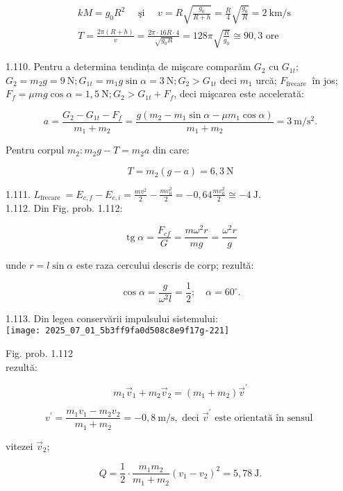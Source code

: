 $$
\begin{aligned}
& k M=g_{0} R^{2} \quad \text { şi } \quad v=R \sqrt{\frac{g_{0}}{R+h}}=\frac{R}{4} \sqrt{\frac{g_{0}}{R}}=2 \mathrm{~km} / \mathrm{s} \\
& T=\frac{2 \pi(R+h)}{v}=\frac{2 \pi \cdot 16 R \cdot 4}{\sqrt{g_{0} R}}=128 \pi \sqrt{\frac{R}{g_{0}}} \cong 90,3 \text { ore }
\end{aligned}
$$

1.110. Pentru a determina tendința de mişcare comparăm $G_{2}$ cu $G_{1 t}$; $G_{2}=m_{2} g=9 \mathrm{~N} ; G_{1 t}=m_{1} g \sin \alpha=3 \mathrm{~N} ; G_{2}>G_{1 t}$ deci $m_{1}$ urcă; $F_{\text {frecare }}$ în jos; $F_{f}=\mu m g \cos \alpha=1,5 \mathrm{~N} ; G_{2}>G_{1 t}+F_{f}$, deci mişcarea este accelerată:

$$
a=\frac{G_{2}-G_{1 t}-F_{f}}{m_{1}+m_{2}}=\frac{g\left(m_{2}-m_{1} \sin \alpha-\mu m_{1} \cos \alpha\right)}{m_{1}+m_{2}}=3 \mathrm{~m} / \mathrm{s}^{2} .
$$

Pentru corpul $m_{2}: m_{2} g-T=m_{2} a$ din care:

$$
T=m_{2}(g-a)=6,3 \mathrm{~N}
$$

1.111. $L_{\text {frecare }}=E_{c, f}-E_{c, i}=\frac{m v^{2}}{2}-\frac{m v_{0}^{2}}{2}=-0,64 \frac{m v_{0}^{2}}{2} \cong-4 \mathrm{~J}$.\\
1.112. Din Fig. prob. 1.112:

$$
\operatorname{tg} \alpha=\frac{F_{c f}}{G}=\frac{m \omega^{2} r}{m g}=\frac{\omega^{2} r}{g}
$$

unde $r=l \sin \alpha$ este raza cercului descris de corp; rezultă:

$$
\cos \alpha=\frac{g}{\omega^{2} l}=\frac{1}{2} ; \quad \alpha=60^{\circ} .
$$

1.113. Din legea conservării impulsului sistemului:\\
\texttt{[image: 2025\_07\_01\_5b3ff9fa0d508c8e9f17g-221]}

Fig. prob. 1.112\\
rezultă:

$$
m_{1} \vec{v}_{1}+m_{2} \vec{v}_{2}=\left(m_{1}+m_{2}\right) \vec{v}^{\prime}
$$

$$
v^{\prime}=\frac{m_{1} v_{1}-m_{2} v_{2}}{m_{1}+m_{2}}=-0,8 \mathrm{~m} / \mathrm{s}, \text { deci } \vec{v}^{\prime} \text { este orientată în sensul }
$$

vitezei $\vec{v}_{2}$;

$$
Q=\frac{1}{2} \cdot \frac{m_{1} m_{2}}{m_{1}+m_{2}}\left(v_{1}-v_{2}\right)^{2}=5,78 \mathrm{~J} .
$$

